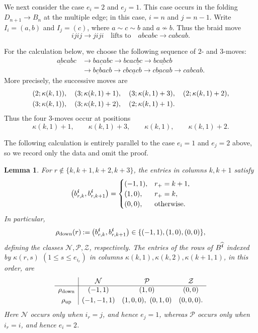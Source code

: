 \documentclass[12pt, leqno]{amsart}
\numberwithin{equation}{section}
\theoremstyle{plain}
\newtheorem{lemma}{Lemma}[section]
\theoremstyle{definition}
\renewcommand{\le}{\leqslant}
\newcommand{\seteq}{\mathbin{:=}}
\newcommand{\ii}{ \textbf{\textit{i}}}
\newcommand{\hii}{{\widehat{\ii}}}
\newcommand{\calN}{\mathcal{N}}
\newcommand{\calP}{\mathcal{P}}
\newcommand{\calZ}{\mathcal{Z}}
\begin{document}
We next consider the case $e_i=2$ and $e_j=1$.
 This case occurs in the folding
$D_{n+1}\longrightarrow B_n$ at the multiple edge; in this case,
$i=n$ and $j=n-1$. Write $I_i=(a,b)$ and $I_j=(c)$,
where $a\sim c\sim b$ and $a\nsim b$. Thus the braid move
\[
ijij\longrightarrow jiji
\quad\text{lifts to}\quad
abcabc\longrightarrow cabcab.
\]

For the calculation below, we choose the following  sequence of $2$- and $3$-moves:{}
\begin{equation}\label{eq: seq of lifted 4-move 2,1}
\begin{aligned}
\underline{ab}cabc
&\longrightarrow b\underline{aca}bc
 \longrightarrow bca\underline{cbc}
 \longrightarrow bc\underline{ab}cb\\
&\longrightarrow \underline{bcb}acb
 \longrightarrow cb\underline{cac}b
 \longrightarrow c\underline{ba}cab
\longrightarrow cabcab.
\end{aligned}
\end{equation}
More precisely, the successive moves are
\begin{align*}
&(2;\kappa(k,1)),\quad (3;\kappa(k,1)+1),\quad
(3;\kappa(k,1)+3),\quad (2;\kappa(k,1)+2),\allowdisplaybreaks\\
&(3;\kappa(k,1)),\quad (3;\kappa(k,1)+2),\quad
(2;\kappa(k,1)+1).
\end{align*}
Thus the four $3$-moves occur at positions
\[
\kappa(k,1)+1,\qquad \kappa(k,1)+3,\qquad \kappa(k,1),\qquad \kappa(k,1)+2.
\]

The following calculation is entirely parallel to the case $e_i=1$ and
$e_j=2$ above, so we record only the data and omit the proof.

\begin{lemma}\label{lem: GLS four move outside rows 21}
For $r\notin\{k,k+1,k+2,k+3\}$, 
the entries in columns $k,k+1$ satisfy
\begin{equation}\label{eq: four move outside row patterns 21}
\bigl(b^\ii_{r,k},b^\ii_{r,k+1}\bigr)=
\begin{cases}
(-1,1),&r_+=k+1,\\
(1,0),&r_+=k,\\
(0,0),&\text{otherwise}.
\end{cases}
\end{equation}
In particular,
\[
\rho_{\rm down}(r)\seteq
\bigl(b^\ii_{r,k},b^\ii_{r,k+1}\bigr)
\in\{(-1,1),(1,0),(0,0)\},
\]
defining the classes $\calN,\calP,\calZ$, respectively.
The entries of  the rows of $B^\hii$ indexed by $\kappa(r,s)$ $(1\le s\le e_{i_r})$ in columns $\kappa(k,1),\kappa(k,2),\kappa(k+1,1)$, in this order, are
\begin{equation}\label{eq: four move active row data 21}
\begin{array}{c|ccc}
 &\calN&\calP&\calZ\\ \hline
\rho_{\rm down}&(-1,1)&(1,0)&(0,0)\\[1mm]
\rho_{\rm up}&(-1,-1,1)&(1,0,0),\ (0,1,0)&(0,0,0).
\end{array}
\end{equation}
Here $\calN$ occurs only when $i_r=j$, and hence  $e_j=1$, whereas $\calP$ occurs only when $i_r=i$,
and hence $e_i=2$.
\end{lemma}
\end{document}
